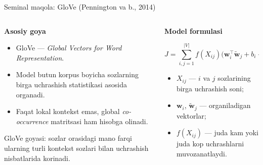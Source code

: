 \documentclass[aspectratio=169,11pt]{beamer}
\begin{document}
\begin{frame}{Seminal maqola: GloVe (Pennington va b., 2014)}
\footnotesize

\begin{columns}[T,totalwidth=\textwidth]
\begin{column}{0.50\textwidth}

\textbf{Asosiy g\textquotesingle{}oya}

\begin{itemize}\setlength\itemsep{4pt}
  \item GloVe — \textit{Global Vectors for Word Representation}.
  \item Model butun korpus bo\textquotesingle{}yicha so\textquotesingle{}zlarning
        birga uchrashish statistikasi asosida o\textquotesingle{}rganadi.
  \item Faqat lokal kontekst emas, global \textit{co-occurrence} matritsasi ham hisobga olinadi.
\end{itemize}

\vspace{4pt}

\begin{tcolorbox}[defbox,left=2mm,right=2mm,top=1mm,bottom=1mm]
\scriptsize
GloVe g\textquotesingle{}oyasi: so\textquotesingle{}zlar orasidagi ma\textquotesingle{}no
farqi ularning turli kontekst so\textquotesingle{}zlari bilan uchrashish
nisbatlarida ko\textquotesingle{}rinadi.
\end{tcolorbox}

\end{column}

\begin{column}{0.46\textwidth}

\textbf{Model formulasi}

\[
J=
\sum_{i,j=1}^{|V|}
f(X_{ij})
\bigl(
\mathbf{w}_i^{\top}\tilde{\mathbf{w}}_j
+
b_i+\tilde{b}_j
-
\log X_{ij}
\bigr)^2
\]

\vspace{2pt}

\begin{itemize}\setlength\itemsep{3pt}
  \item $X_{ij}$ — $i$ va $j$ so\textquotesingle{}zlarining birga uchrashish soni;
  \item $\mathbf{w}_i$, $\tilde{\mathbf{w}}_j$ — o\textquotesingle{}rganiladigan vektorlar;
  \item $f(X_{ij})$ — juda kam yoki juda ko\textquotesingle{}p uchrashlarni muvozanatlaydi.
\end{itemize}


\end{column}
\end{columns}
\end{frame}
\end{document}
